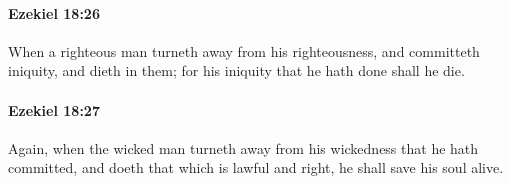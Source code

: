 		\paragraph{Ezekiel 18:26} %
			\label{EZEKIEL-18-26}

			When a righteous man turneth away from his righteousness, and committeth iniquity, and dieth in them; for his iniquity that he hath done shall he die.


		\paragraph{Ezekiel 18:27} %
			\label{EZEKIEL-18-27}

			Again, when the wicked man turneth away from his wickedness that he hath committed, and doeth that which is lawful and right, he shall save his soul alive.


